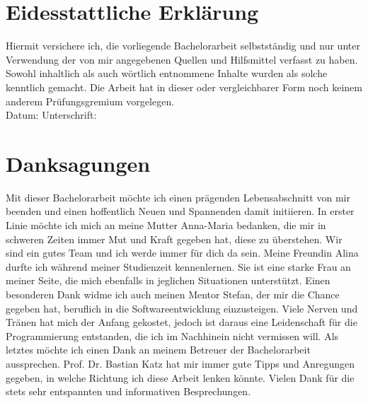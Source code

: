 \setcounter{secnumdepth}{0}
\section{Eidesstattliche Erklärung}

Hiermit versichere ich, die vorliegende Bachelorarbeit selbstständig und nur unter Verwendung der von mir angegebenen Quellen und Hilfsmittel verfasst zu haben. Sowohl inhaltlich als auch wörtlich entnommene Inhalte wurden als solche kenntlich gemacht. Die Arbeit hat in dieser oder vergleichbarer Form noch keinem anderem Prüfungsgremium vorgelegen.
\\[1.5cm]
Datum:	\hrulefill\enspace Unterschrift: \hrulefill


\newpage

\section{Danksagungen}
Mit dieser Bachelorarbeit möchte ich einen prägenden Lebensabschnitt von mir beenden und einen hoffentlich Neuen und Spannenden damit initiieren. In erster Linie möchte ich mich an meine Mutter Anna-Maria bedanken, die mir in schweren Zeiten immer Mut und Kraft gegeben hat, diese zu überstehen. Wir sind ein gutes Team und ich werde immer für dich da sein. Meine Freundin Alina durfte ich während meiner Studienzeit kennenlernen. Sie ist eine starke Frau an meiner Seite, die mich ebenfalls in jeglichen Situationen unterstützt. Einen besonderen Dank widme ich auch meinen Mentor Stefan, der mir die Chance gegeben hat, beruflich in die Softwareentwicklung einzusteigen. Viele Nerven und Tränen hat mich der Anfang gekostet, jedoch ist daraus eine Leidenschaft für die Programmierung entstanden, die ich im Nachhinein nicht vermissen will. Als letztes möchte ich einen Dank an meinem Betreuer der Bachelorarbeit aussprechen. Prof. Dr. Bastian Katz hat mir immer gute Tipps und Anregungen gegeben, in welche Richtung ich diese Arbeit lenken könnte. Vielen Dank für die stets sehr entspannten und informativen Besprechungen.
